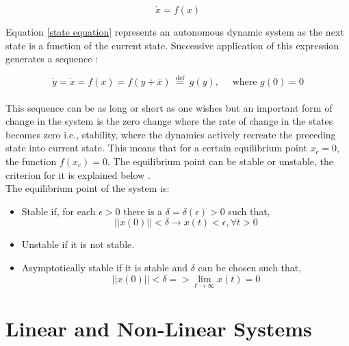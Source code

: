 \documentclass{UoNMCHA}
\numberwithin{equation}{section}
\begin{document}
	\begin{equation} \label{state equation}
	\dot{x} = f(x)
	\end{equation} 
	
	Equation \ref{state equation} represents an autonomous dynamic system as the next state is a function of the current state. Successive application of this expression generates a sequence \cite{hasankhalil_2002_solutions}: 
	
	\begin{equation} \label{arrows equation}
\dot{y}=\dot{x}=f(x)=f(y+\bar{x}) \stackrel{\text { def }}{=} g(y), \quad \text { where } g(0)=0
	\end{equation} \\
	
	This sequence can be as long or short as one wishes but an important form of change in the system is the zero change where the rate of change in the states becomes zero i.e., stability, where the dynamics actively recreate the preceding state into current state. This means that for a certain equilibrium point $x_{c}= 0$, the function $f(x_{c})=0$. The equilibrium point can be stable or unstable, the criterion for it is explained below \cite{hasankhalil_2002_solutions}. \\
	
	\newpage
	The equilibrium point of the system is: \\
	
	\begin{itemize}
		\item 	Stable if, for each $\epsilon>0$ there is a $\delta=\delta (\epsilon)>0$ such that,
		\begin{equation*}
		\left|\left|x\left(0\right)\right|\right|<\delta\rightarrow x(t)<\epsilon,\forall t>0  
		\end{equation*}
		\item Unstable if it is not stable.
		\item Asymptotically stable if it is stable and $\delta$ can be chosen such that,
		\begin{equation*}
		\left|\left|x\left(0\right)\right|\right|<\delta=>\lim_{t\to \infty}{x(t)=0}
		\end{equation*}
		
	\end{itemize}
		
	
	\section{Linear and Non-Linear Systems}\label{Linear and Non-Linear Systems}
	
\end{document}
